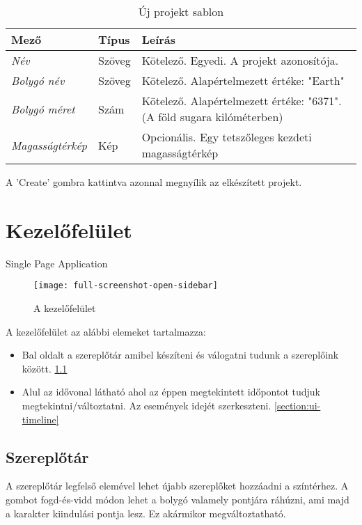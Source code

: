 \begin{table}[H]
	\centering
	\begin{tabular}{ | m{} | m{} | m{} | }
		\hline
		\textbf{Mező} & \textbf{Típus} & \textbf{Leírás} \\
		\hline \hline
		\emph{Név} & Szöveg & Kötelező. Egyedi. A projekt azonosítója. \\
		\hline
		\emph{Bolygó név} & Szöveg & Kötelező. Alapértelmezett értéke: "Earth" \\
		\hline
		\emph{Bolygó méret} & Szám & Kötelező. Alapértelmezett értéke: "6371". (A föld sugara kilóméterben)  \\
		\hline
		\emph{Magasságtérkép} & Kép & Opcionális. Egy tetszőleges kezdeti magasságtérkép  \\
		\hline
	\end{tabular}
	\caption{Új projekt sablon}
	\label{tab:create-project-form}
\end{table}

A 'Create' gombra kattintva azonnal megnyílik az elkészített projekt.

\section{Kezelőfelület} \label{section:ui}

Single Page Application
\begin{figure}[h!]
	\centering
	\texttt{[image: full-screenshot-open-sidebar]}
	\caption{
		A kezelőfelület}
	\label{fig:full-screenshot-open-sidebar}
\end{figure}

A kezelőfelület az alábbi elemeket tartalmazza:

\begin{itemize}
	\item Bal oldalt a szereplőtár amibel készíteni és válogatni tudunk a szereplőink között. \ref{section:ui-actors}
	\item Alul az idővonal látható ahol az éppen megtekintett időpontot tudjuk megtekintni/változtatni. Az események idejét szerkeszteni.  \ref{section:ui-timeline}
\end{itemize}

\subsection{Szereplőtár} \label{section:ui-actors}

A szereplőtár legfelső elemével lehet újabb szereplőket hozzáadni a színtérhez. A gombot fogd-és-vidd módon lehet a bolygó valamely pontjára ráhúzni, ami majd a karakter kiindulási pontja lesz. Ez akármikor megváltoztatható.

